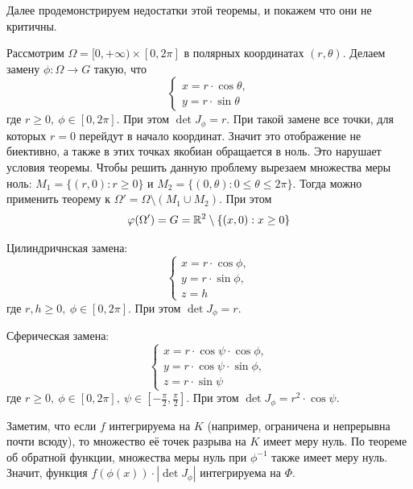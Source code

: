\noindent Далее продемонстрируем недостатки этой теоремы, и покажем что они не критичны.
\begin{example}
    Рассмотрим $\Omega=[0,+\infty)\times [0,2\pi]$ в полярных координатах $(r,\theta)$. Делаем замену $\phi:\Omega\to G$ такую, что
    \[\begin{cases}
        x=r\cdot \cos{\theta},\\
        y=r\cdot \sin{\theta}
    \end{cases}\]
    где $r\geq 0,\ \phi\in [0,2\pi]$. При этом $\det{J}_{\phi}=r$.
    При такой замене все точки, для которых $r=0$ перейдут в начало координат. Значит это отображение не биективно, а также в этих точках якобиан обращается в ноль. Это нарушает условия теоремы. Чтобы решить данную проблему вырезаем множества меры ноль: $M_1=\{(r,0): r\geq 0\}$ и $M_2=\{(0,\theta): 0\leq \theta\leq 2\pi\}$. Тогда можно применить теорему к $\Omega'=\Omega\setminus (M_1\cup M_2)$. При этом 
    \[\varphi(\Omega')=G=\mathbb{R}^2\setminus\{(x,0): x\geq 0\}\]
\end{example}
\begin{example}
    Цилиндричнская замена:
    \[\begin{cases}
        x=r\cdot \cos{\phi},\\
        y=r\cdot \sin{\phi},\\
        z=h
    \end{cases}\]
    где $r,h\geq 0,\ \phi\in [0, 2\pi]$. При этом $\det{J_{\phi}}=r$.
\end{example}
\begin{example}
    Сферическая замена:
    \[\begin{cases}
        x=r\cdot \cos{\psi}\cdot \cos{\phi},\\
        y=r\cdot \cos{\psi}\cdot \sin{\phi},\\
        z=r\cdot \sin{\psi}
    \end{cases}\]
    где $r\geq 0,\ \phi\in [0, 2\pi],\ \psi\in[-\frac{\pi}{2},\frac{\pi}{2}]$. При этом $\det{J_{\phi}}=r^2\cdot \cos{\psi}$.
\end{example}
\begin{comm}
    Заметим, что если $f$ интегрируема на $K$ (например, ограничена и непрерывна почти всюду), то множество её точек разрыва на $K$ имеет меру нуль. По теореме об обратной функции, множества меры нуль при $\phi^{-1}$ также имеет меру нуль. Значит, функция $f(\phi(x))\cdot |\det J_{\phi}|$ интегрируема на $\Phi$.
\end{comm}
